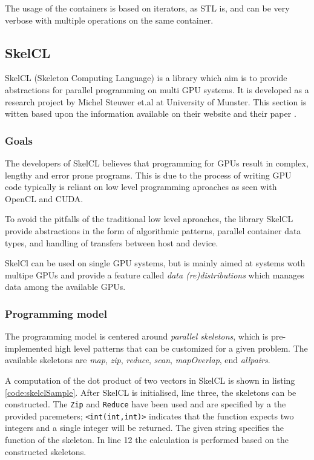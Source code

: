 The usage of the containers is based on iterators, as STL is, and can be very verbose with multiple operations on the same container.

\subsection{SkelCL}
SkelCL (Skeleton Computing Language) is a library which aim is to provide abstractions for parallel programming on multi GPU systems. It is developed as a research project by Michel Steuwer et.al at University of Munster. This section is witten based upon the information available on their website \cite{skelclWebsite} and their paper \cite{skelclPaper}.

\subsubsection{Goals}
The developers of SkelCL believes that programming for GPUs result in complex, lengthy and error prone programs. This is due to the process of writing GPU code typically is reliant on low level programming aproaches as seen with OpenCL and CUDA. 

To avoid the pitfalls of the traditional low level aproaches, the library SkelCL provide abstractions in the form of algorithmic patterns, parallel container data types, and handling of transfers between host and device. 

SkelCl can be used on single GPU systems, but is mainly aimed at systems woth multipe GPUs and provide a feature called \textit{data (re)distributions} which manages data among the available GPUs.

\subsubsection{Programming model}
The programming model is centered around \textit{parallel skeletons}, which is pre-implemented high level patterns that can be customized for a given problem. The available skeletons are \textit{map}, \textit{zip}, \textit{reduce}, \textit{scan}, \textit{mapOverlap}, end \textit{allpairs}.

A computation of the dot product of two vectors in SkelCL is shown in listing \ref{code:skelclSample}. After SkelCL is initialised, line three, the skeletons can be constructed. The \texttt{Zip} and \texttt{Reduce} have been used and are specified by a the provided paremeters; \texttt{<int(int,int)>} indicates that the function expects two integers and a single integer will be returned. The given string specifies the function of the skeleton. In line 12 the calculation is performed based on the constructed skeletons.


